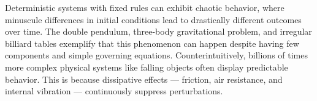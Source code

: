 Deterministic systems with fixed rules can exhibit chaotic behavior, where minuscule differences in initial conditions lead to drastically different outcomes over time. The double pendulum, three-body gravitational problem, and irregular billiard tables exemplify that this phenomenon can happen despite having few components and simple governing equations. Counterintuitively, billions of times more complex physical systems like falling objects often display predictable behavior. This is because dissipative effects — friction, air resistance, and internal vibration — continuously suppress perturbations.
